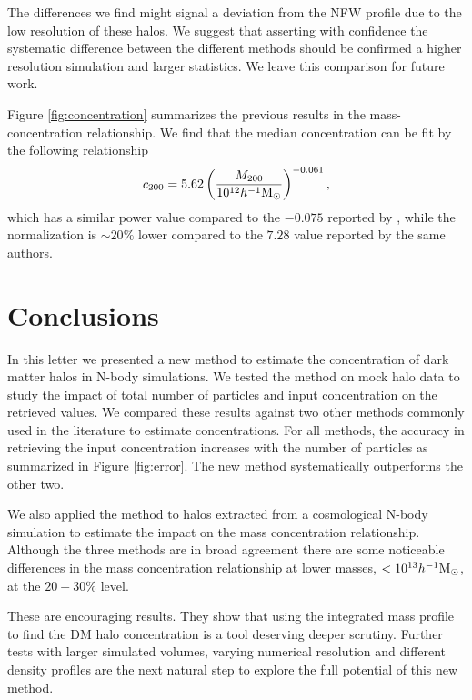 \documentclass[a4,useAMS,usenatbib,usegraphicx]{mn2e}
\newcommand{\hMsun}{{\ifmmode{h^{-1}{\rm {M_{\odot}}}}\else{$h^{-1}{\rm{M_{\odot}}}$}\fi}}
\begin{document}
The differences we find might signal a deviation from the NFW profile
due to the low resolution of these halos. We suggest that asserting
with confidence the systematic difference between the different
methods should be confirmed  a higher resolution simulation and larger
statistics. We leave this comparison for future work.  
  

Figure \ref{fig:concentration} summarizes the previous results in the
mass-concentration relationship. 
We find that the median concentration
can be fit by the following relationship
\begin{equation} c_{200} = 5.62 \left(\frac{M_{200}}{10^{12}\hMsun}\right)^{-0.061}, 
\end{equation}
%
which has a similar power value compared to the $-0.075$ reported by
\citep{Prada2012}, while the normalization is $\sim 20\%$ lower
compared to the $7.28$ value reported by the same authors. 



\section{Conclusions}
\label{sec:conclusions}

In this letter we presented a new method to estimate the concentration
of dark matter halos in N-body simulations.  
We tested the method on mock halo data to study the impact of total
number of particles and input concentration on the retrieved values.  
We compared these results against two other methods commonly used in
the literature to estimate concentrations.  
For all methods, the accuracy in retrieving the input concentration
increases with the number of particles as summarized in Figure
\ref{fig:error}.  The new method systematically outperforms the other two.

We also applied the method to halos extracted from a cosmological
N-body simulation to estimate the impact on the mass concentration
relationship. Although the three  methods are in broad agreement there
are some noticeable differences in the mass concentration relationship
at lower masses, $<10^{13}\hMsun$, at the $20-30\%$ level.

These are encouraging results. They show that using the integrated
mass profile to find the DM halo concentration is a tool deserving
deeper scrutiny. Further tests with larger simulated volumes, varying
numerical resolution and different density profiles are
the next natural step to explore the full potential of this
new method. 
\end{document}

